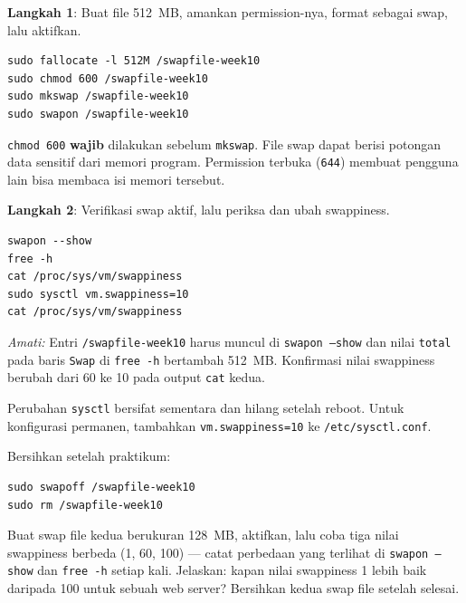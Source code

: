 \textbf{Langkah 1}: Buat file 512~MB, amankan permission-nya, format sebagai swap,
lalu aktifkan.

\begin{lstlisting}[caption={Membuat dan mengaktifkan swap}]
sudo fallocate -l 512M /swapfile-week10
sudo chmod 600 /swapfile-week10
sudo mkswap /swapfile-week10
sudo swapon /swapfile-week10
\end{lstlisting}

\begin{warningbox}
\texttt{chmod 600} \textbf{wajib} dilakukan sebelum \texttt{mkswap}. File swap dapat
berisi potongan data sensitif dari memori program. Permission terbuka (\texttt{644})
membuat pengguna lain bisa membaca isi memori tersebut.
\end{warningbox}

\textbf{Langkah 2}: Verifikasi swap aktif, lalu periksa dan ubah swappiness.

\begin{lstlisting}[caption={Verifikasi dan atur swappiness}]
swapon --show
free -h
cat /proc/sys/vm/swappiness
sudo sysctl vm.swappiness=10
cat /proc/sys/vm/swappiness
\end{lstlisting}

\textit{Amati:} Entri \texttt{/swapfile-week10} harus muncul di \texttt{swapon --show}
dan nilai \texttt{total} pada baris \texttt{Swap} di \texttt{free -h} bertambah 512~MB.
Konfirmasi nilai swappiness berubah dari 60 ke 10 pada output \texttt{cat} kedua.

\begin{notebox}
Perubahan \texttt{sysctl} bersifat sementara dan hilang setelah reboot. Untuk
konfigurasi permanen, tambahkan \texttt{vm.swappiness=10} ke \texttt{/etc/sysctl.conf}.

Bersihkan setelah praktikum:
\begin{lstlisting}
sudo swapoff /swapfile-week10
sudo rm /swapfile-week10
\end{lstlisting}
\end{notebox}

\begin{challengebox}
Buat swap file kedua berukuran 128~MB, aktifkan, lalu coba tiga nilai swappiness
berbeda (1, 60, 100) --- catat perbedaan yang terlihat di \texttt{swapon --show}
dan \texttt{free -h} setiap kali. Jelaskan: kapan nilai swappiness 1 lebih baik
daripada 100 untuk sebuah web server? Bersihkan kedua swap file setelah selesai.
\end{challengebox}


